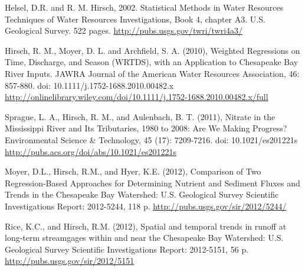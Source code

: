 \documentclass[a4paper,11pt]{article}\usepackage{graphicx, color}
\begin{document}
\clearpage
\begin{thebibliography}{10}

Helsel, D.R. and R. M. Hirsch, 2002. Statistical Methods in Water Resources Techniques of Water Resources Investigations, Book 4, chapter A3. U.S. Geological Survey. 522 pages. \url{http://pubs.usgs.gov/twri/twri4a3/}

Hirsch, R. M., Moyer, D. L. and Archfield, S. A. (2010), Weighted Regressions on Time, Discharge, and Season (WRTDS), with an Application to Chesapeake Bay River Inputs. JAWRA Journal of the American Water Resources Association, 46: 857-880. doi: 10.1111/j.1752-1688.2010.00482.x \url{http://onlinelibrary.wiley.com/doi/10.1111/j.1752-1688.2010.00482.x/full}

Sprague, L. A., Hirsch, R. M., and Aulenbach, B. T. (2011), Nitrate in the Mississippi River and Its Tributaries, 1980 to 2008: Are We Making Progress? Environmental Science \& Technology, 45 (17): 7209-7216. doi: 10.1021/es201221s \url{http://pubs.acs.org/doi/abs/10.1021/es201221s}

Moyer, D.L., Hirsch, R.M., and Hyer, K.E. (2012), Comparison of Two Regression-Based Approaches for Determining Nutrient and Sediment Fluxes and Trends in the Chesapeake Bay Watershed: U.S. Geological Survey Scientific Investigations Report: 2012-5244, 118 p. \url{http://pubs.usgs.gov/sir/2012/5244/}

Rice, K.C., and Hirsch, R.M. (2012), Spatial and temporal trends in runoff at long-term streamgages within and near the Chesapeake Bay Watershed: U.S. Geological Survey Scientific Investigations Report: 2012-5151, 56 p. \url{http://pubs.usgs.gov/sir/2012/5151}


\end{thebibliography}
\end{document}
